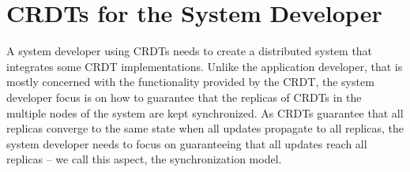 \documentclass[12pt]{article}
\begin{document}
%
%
%
%
%
%
%
%


\section{CRDTs for the System Developer}\label{sec:sysdev}

A system developer using CRDTs needs to create a distributed system that integrates 
some CRDT implementations. Unlike the application developer, that is mostly concerned with the
functionality provided by the CRDT, the system developer focus is on how to guarantee
that the replicas of CRDTs in the multiple nodes of the system are kept synchronized.
As CRDTs guarantee that all replicas converge to the same state when all updates
propagate to all replicas, the system developer needs to focus on guaranteeing that
all updates reach all replicas -- we call this aspect, the synchronization model. 
\end{document}
